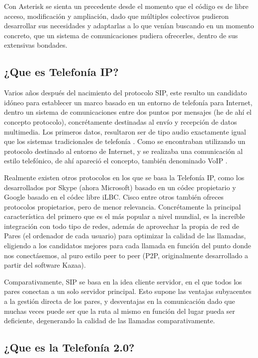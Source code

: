 Con Asterisk se sienta un precedente desde el momento que el código es de libre acceso, modificación y ampliación, dado que múltiples colectivos pudieron desarrollar sus necesidades y adaptarlas a lo que venían buscando en un momento concreto, que un sistema de comunicaciones pudiera ofrecerles, dentro de sus extensivas bondades. 

\subsection{¿Que es Telefonía IP?}

Varios años después del nacimiento del protocolo SIP, este resulto un candidato idóneo para establecer un marco basado en un entorno de telefonía para Internet, dentro un sistema de comunicaciones entre dos puntos por mensajes (he de ahí el concepto protocolo), concrétamente destinadas al envío y recepción de datos multimedia. Los primeros datos, resultaron ser de tipo audio exactamente igual que los sistemas tradicionales de telefonía \cite{perkins03}. Como se encontraban utilizando un protocolo destinado al entorno de Internet, y se realizaba una comunicación al estilo telefónico, de ahí apareció el concepto, también denominado VoIP \cite{wallingford05} \cite{website:voip}.

Realmente existen otros protocolos en los que se basa la Telefonía IP, como los desarrollados por Skype (ahora Microsoft) basado en un códec propietario y Google basado en el códec libre iLBC. Cisco entre otros también ofreces protocolos propietarios, pero de menor relevancia. Concrétamente la principal característica del primero que es el más popular a nivel mundial, es la increíble integración con todo tipo de redes, además de aprovechar la propia de red de Pares (el ordenador de cada usuario) para optimizar la calidad de las llamadas, eligiendo a los candidatos mejores para cada llamada en función del punto donde nos conectásemos, al puro estilo peer to peer (P2P, originalmente desarrollado a partir del software Kazaa). 

Comparativamente, SIP se basa en la idea cliente servidor, en el que todos los pares conectan a un solo servidor principal. Esto supone las ventajas subyacentes a la gestión directa de los pares, y desventajas en la comunicación dado que muchas veces puede ser que la ruta al mismo en función del lugar pueda ser deficiente, degenerando la calidad de las llamadas comparativamente.

\subsection{¿Que es la Telefonía 2.0?}

